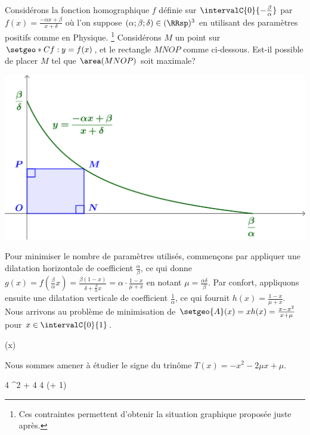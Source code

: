 Considérons la fonction homographique $f$ définie sur $\intervalC{0}{- \frac{\beta}{\alpha}}$ par $f(x) = \frac{- \alpha x + \beta}{x + \delta}$ où l'on suppose $(\alpha ; \beta ; \delta) \in (\RRsp)^3$ en utilisant des paramètres positifs comme en Physique.%
\footnote{
	Ces contraintes permettent d'obtenir la situation graphique proposée juste après.
}
%
Considérons $M$ un point sur $\setgeo*{C}{f}: y = f(x)$, et le rectangle $MNOP$ comme ci-dessous. Est-il possible de placer $M$ tel que $\area(MNOP)$ soit maximale?

\smallskip

\begin{center}
	\includegraphics[scale=.67]{goal.png}
\end{center}

Pour minimiser le nombre de paramètres utilisés,
commençons par appliquer une dilatation horizontale de coefficient $\frac{\alpha}{\beta}$,
ce qui donne 
$g(x) = f( \frac{\beta}{\alpha} x ) 
      = \frac{\beta(1 - x)}{\delta + \frac{\beta}{\alpha} x}
      = \alpha \cdot \frac{1 - x}{\mu + x}$
en notant $\mu = \frac{\alpha \delta}{\beta}$.
Par confort,
appliquons ensuite une dilatation verticale de coefficient $\frac{1}{\alpha}$,
ce qui fournit 
$h(x) = \frac{1 - x}{\mu + x}$.
%
Nous arrivons au problème de minimisation de
$\setgeo{A}(x) = x h(x) = \frac{x - x^2}{x + \mu}$
pour $x \in \intervalC{0}{1}$.

\begin{stepcalc}[style=sar]
	(x)
\explnext{}
\explnext{}
\end{stepcalc}

Nous sommes amener à étudier le signe du trinôme
$T(x) = - x^2 - 2 \mu x + \mu$.

\begin{stepcalc}[style=sar]
	\Delta
\explnext{}
	4 \mu^2 + 4 \mu
\explnext{}
	4 \mu (\mu + 1)
\end{stepcalc}

